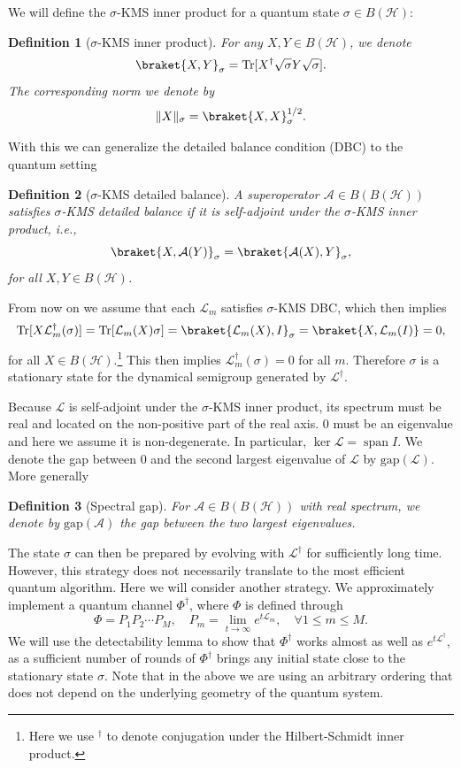 \documentclass{article}
\theoremstyle{plain}
\theoremstyle{plain}
\theoremstyle{plain}
\theoremstyle{plain}
\theoremstyle{plain}
\theoremstyle{plain}
\theoremstyle{plain}
\newtheorem{defn}{Definition}
\newcommand{\Tr}{\mathrm{Tr}}
\DeclareMathOperator{\spanop}{span}
\begin{document}
We will define the $\sigma$-KMS inner product for a quantum state $\sigma\in B(\mathcal{H})$:
\begin{defn}[$\sigma$-KMS inner product]
\label{defn:KMS_inner_product}
    For any $X,Y\in B(\mathcal{H})$, we denote
    \[
    \braket{X,Y}_\sigma = \Tr[X^\dag \sqrt{\sigma} Y \sqrt{\sigma}].
    \]
    The corresponding norm we denote by
    \[
    \|X\|_\sigma = \braket{X,X}_\sigma^{1/2}.
    \]
\end{defn}
With this we can generalize the detailed balance condition (DBC) to the quantum setting
\begin{defn}[$\sigma$-KMS detailed balance]
\label{defn:KMS_detailed_balance}
    A superoperator $\mathcal{A}\in B(B(\mathcal{H}))$ satisfies $\sigma$-KMS detailed balance if it is self-adjoint under the $\sigma$-KMS inner product, i.e.,
    \[
    \braket{X,\mathcal{A}(Y)}_\sigma = \braket{\mathcal{A}(X),Y}_\sigma,
    \]
    for all $X,Y\in B(\mathcal{H})$.
\end{defn}

From now on we assume that each $\mathcal{L}_m$ satisfies $\sigma$-KMS DBC, which then implies
\[
\Tr[X\mathcal{L}_m^\dag(\sigma)] = \Tr[\mathcal{L}_m(X)\sigma] = \braket{\mathcal{L}_m(X),I}_\sigma = \braket{X,\mathcal{L}_m(I)}=0,
\]
for all $X\in B(\mathcal{H})$.\footnote{Here we use $^\dag$ to denote conjugation under the Hilbert-Schmidt inner product.} This then implies $\mathcal{L}_m^\dag(\sigma)=0$ for all $m$. Therefore $\sigma$ is a stationary state for the dynamical semigroup generated by $\mathcal{L}^\dag$.

Because $\mathcal{L}$ is self-adjoint under the $\sigma$-KMS inner product, its spectrum must be real and located on the non-positive part of the real axis. $0$ must be an eigenvalue and here we assume it is non-degenerate. In particular, $\ker \mathcal{L} = \spanop{I}$. We denote the gap between $0$ and the second largest eigenvalue of $\mathcal{L}$ by $\mathrm{gap}(\mathcal{L})$. More generally
\begin{defn}[Spectral gap]
    For $\mathcal{A}\in B(B(\mathcal{H}))$ with real spectrum, we denote by $\mathrm{gap}(\mathcal{A})$ the gap between the two largest eigenvalues.
\end{defn}

The state $\sigma$ can then be prepared by evolving with $\mathcal{L}^\dag$ for sufficiently long time. However, this strategy does not necessarily translate to the most efficient quantum algorithm. Here we will consider another strategy. 
We approximately implement a quantum channel $\Phi^\dag$, where $\Phi$ is defined through
\begin{equation}
\label{eq:detectability_lem_op}
    \Phi = P_1 P_2\cdots P_M,\quad P_m = \lim_{t\to \infty} e^{t\mathcal{L}_m},\quad \forall 1\leq m\leq M.
\end{equation}
We will use the detectability lemma to show that $\Phi^\dag$ works almost as well as $e^{t\mathcal{L}^\dag}$, as a sufficient number of rounds of $\Phi^\dag$ brings any initial state close to the stationary state $\sigma$.
Note that in the above we are using an arbitrary ordering that does not depend on the underlying geometry of the quantum system.
\end{document}
